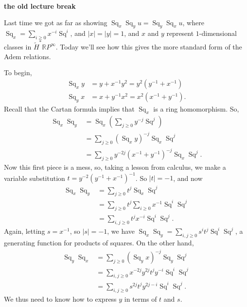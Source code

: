 \documentclass{article}
\newcommand{\R}{\mathbb{R}}
\newcommand{\RP}{\R P}
\DeclareMathOperator{\Sq}{Sq}
\theoremstyle{definition}
\begin{document}
\textbf{the old lecture break}

Last time we got as far as showing $\Sq_x \Sq_y u = \Sq_y \Sq_x u$, where $\Sq_x = \sum_{i \ge 0} x^{-i} \Sq^i$, and $|x| = |y| = 1$, and $x$ and $y$ represent $1$-dimensional classes in $\widetilde H^* \RP^\infty$. %
Today we'll see how this gives the more standard form of the Adem relations.

To begin,
\begin{align*}
\Sq_x y & = y + x^{-1} y^2 = y^2(y^{-1} + x^{-1}) \\
\Sq_y x & = x + y^{-1} x^2 = x^2(x^{-1} + y^{-1}).
\end{align*}
Recall that the Cartan formula implies that $\Sq_x$ is a ring homomorphism.  So,
\begin{align*}
\Sq_x \Sq_y & = \Sq_x \left( \sum_{j \ge 0} y^{-j} \Sq^j \right) \\
& = \sum_{j \ge 0}(\Sq_x y)^{-j} \Sq_x \Sq^j \\
& = \sum_{j \ge 0} y^{-2j}(x^{-1} + y^{-1})^{-j} \Sq_x \Sq^j.
\end{align*}
Now this first piece is a mess, so, taking a lesson from calculus, we make a variable substitution $t = y^{-2}(y^{-1} + x^{-1})^{-1}$.  So $|t| = -1$, and now
\begin{align*}
\Sq_x \Sq_y & = \sum_{j \ge 0} t^j \Sq_x \Sq^j \\
& = \sum_{j \ge 0} t^j \sum_{i \ge 0} x^{-1} \Sq^i \Sq^j \\
& = \sum_{i, j \ge 0} t^j x^{-i} \Sq^i \Sq^j.
\end{align*}
Again, letting $s = x^{-1}$, so $|s| = -1$, we have $\Sq_x \Sq_y = \sum_{i, j \ge 0} s^i t^j \Sq^i \Sq^j$, a generating function for products of squares.  On the other hand,
\begin{align*}
\Sq_y \Sq_x & = \sum_{j \ge 0}(\Sq_y x)^{-j} \Sq_y \Sq^j \\
& = \sum_{i, j \ge 0} x^{-2j} y^{2j} t^j y^{-i} \Sq^i \Sq^j \\
& = \sum_{i, j \ge 0} s^{2j} t^j y^{2j-i} \Sq^i \Sq^j.
\end{align*}
We thus need to know how to express $y$ in terms of $t$ and $s$.
\end{document}
